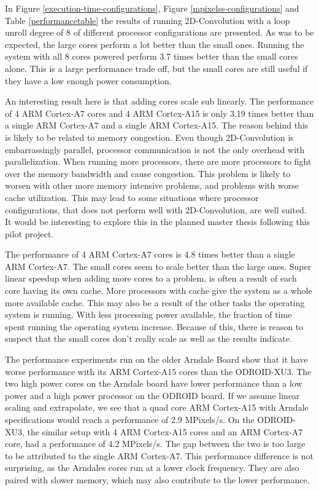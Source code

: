In Figure \ref{execution-time-configurations}, Figure \ref{mpixelss-configurations} and Table \ref{performancetable} the results of running 2D-Convolution with a loop unroll degree of 8 of different processor configurations are presented.
As was to be expected, the large cores perform a lot better than the small ones.
Running the system with all 8 cores powered perform 3.7 times better than the small cores alone.
This is a large performance trade off, but the small cores are still useful if they have a low enough power consumption.

An interesting result here is that adding cores scale sub linearly.
The performance of 4 ARM Cortex-A7 cores and 4 ARM Cortex-A15 is only 3.19 times better than a single ARM Cortex-A7 and a single ARM Cortex-A15.
The reason behind this is likely to be related to memory congestion.
Even though 2D-Convolution is embarrassingly parallel, processor communication is not the only overhead with parallelization.
When running more processors, there are more processors to fight over the memory bandwidth and cause congestion.
This problem is likely to worsen with other more memory intensive problems, and problems with worse cache utilization.
This may lead to some situations where processor configurations, that does not perform well with 2D-Convolution, are well suited.
It would be interesting to explore this in the planned master thesis following this pilot project.

The performance of 4 ARM Cortex-A7 cores is 4.8 times better than a single ARM Cortex-A7.
The small cores seem to scale better than the large ones.
Super linear speedup when adding more cores to a problem, is often a result of each core having its own cache.
More processors with cache give the system as a whole more available cache.
This may also be a result of the other tasks the operating system is running.
With less processing power available, the fraction of time spent running the operating system increase.
Because of this, there is reason to suspect that the small cores don't really scale as well as the results indicate.

The performance experiments run on the older Arndale Board show that it have worse performance with its ARM Cortex-A15 cores than the ODROID-XU3.
The two high power cores on the Arndale board have lower performance than a low power and a high power processor on the ODROID board.
If we assume linear scaling and extrapolate, we see that a quad core ARM Cortex-A15 with Arndale specifications would reach a performance of 2.9 MPixels/s.
On the ODROID-XU3, the similar setup with 4 ARM Cortex-A15 cores and an ARM Cortex-A7 core, had a performance of 4.2 MPixels/s.
The gap between the two is too large to be attributed to the single ARM Cortex-A7.
This performance difference is not surprising, as the Arndales cores run at a lower clock frequency.
They are also paired with slower memory, which may also contribute to the lower performance.

